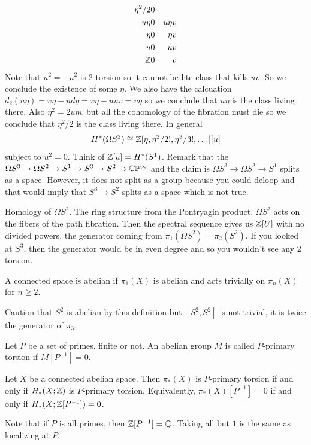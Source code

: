 \documentclass[12pt]{article}
\begin{document}
    \begin{align*}
        \eta^2/2 & 0 & \\
        u\eta & 0 & u \eta v \\
        \eta & 0 & \eta v \\
        u & 0 & uv \\
        \mathbb{Z} & 0 & v
    \end{align*}
    Note that $u^2 = -u^2$ is 2 torsion so it cannot be hte class that kills $uv$. So we conclude the existence of some $\eta$. We also have the calcuation $d_2(u\eta) = v\eta - u d\eta = v\eta - uuv = v\eta$ so we conclude that $u\eta$ is the class living there. Also $\eta^2 = 2u\eta v$ but all the cohomology of the fibration must die so we conclude that $\eta^2/2$ is the class living there. In general \begin{align*}
        H^*(\Omega S^2) \cong \mathbb{Z}[\eta, \eta^2/2!, \eta^3/3!, \dots][u]
    \end{align*} subject to $u^2 = 0$. Think of $\mathbb{Z}[u] = H^*(S^1)$. Remark that the $\Omega S^3 \to \Omega S^2 \to S^1 \to S^3 \to S^2 \to \mathbb{C}\mathbb{P}^\infty$ and the claim is $\Omega S^3 \to \Omega S^2 \to S^1$ splits as a space. However, it does not split as a group because you could deloop and that would imply that $S^3 \to S^2$ splits as a space which is not true. 

    Homology of $\Omega S^2$. The ring structure from the Pontryagin product. $\Omega S^2$ acts on the fibers of the path fibration. Then the spectral sequence gives us $\mathbb{Z}[U]$ with no divided powers, the generator coming from $\pi_1(\Omega S^2) = \pi_2(S^2)$. If you looked at $S^3$, then the generator would be in even degree and so you wouldn't see any 2 torsion.

    \begin{definition}
        A connected space is abelian if $\pi_1(X)$ is abelian and acts trivially on $\pi_n(X)$ for $n\geq 2$.
    \end{definition}
    Caution that $S^2$ is abelian by this definition but $[S^2,S^2]$ is not trivial, it is twice the generator of $\pi_3$.
    \begin{definition}
        Let $P$ be a set of primes, finite or not. An abelian group $M$ is called $P$-primary torsion if $M[P^{-1}] = 0$. 
    \end{definition}
    \begin{theorem}
        Let $X$ be a connected abelian space. Then $\pi_*(X)$ is $P$-primary torsion if and only if $H_*(X;\mathbb{Z})$ is $P$-primary torsion. Equivalently, $\pi_*(X)[P^{-1}] = 0$ if and only if $H_*(X;\mathbb{Z}[P^{-1}]) = 0$.
    \end{theorem}
Note that if $P$ is all primes, then $\mathbb{Z}[P^{-1}] = \mathbb{Q}$. Taking all but $1$ is the same as localizing at $P$.
\end{document}
